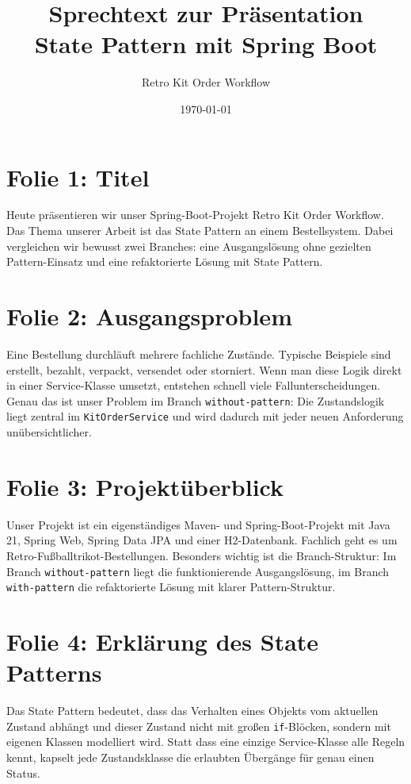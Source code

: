 \documentclass[a4paper,11pt]{article}
\title{Sprechtext zur Präsentation\\State Pattern mit Spring Boot}
\author{Retro Kit Order Workflow}
\date{\today}
\begin{document}
\maketitle

\section*{Folie 1: Titel}
Heute präsentieren wir unser Spring-Boot-Projekt \glqq Retro Kit Order Workflow\grqq. Das Thema unserer Arbeit ist das State Pattern an einem Bestellsystem. Dabei vergleichen wir bewusst zwei Branches: eine Ausgangslösung ohne gezielten Pattern-Einsatz und eine refaktorierte Lösung mit State Pattern.

\section*{Folie 2: Ausgangsproblem}
Eine Bestellung durchläuft mehrere fachliche Zustände. Typische Beispiele sind erstellt, bezahlt, verpackt, versendet oder storniert. Wenn man diese Logik direkt in einer Service-Klasse umsetzt, entstehen schnell viele Fallunterscheidungen. Genau das ist unser Problem im Branch \texttt{without-pattern}: Die Zustandslogik liegt zentral im \texttt{KitOrderService} und wird dadurch mit jeder neuen Anforderung unübersichtlicher.

\section*{Folie 3: Projektüberblick}
Unser Projekt ist ein eigenständiges Maven- und Spring-Boot-Projekt mit Java 21, Spring Web, Spring Data JPA und einer H2-Datenbank. Fachlich geht es um Retro-Fußballtrikot-Bestellungen. Besonders wichtig ist die Branch-Struktur: Im Branch \texttt{without-pattern} liegt die funktionierende Ausgangslösung, im Branch \texttt{with-pattern} die refaktorierte Lösung mit klarer Pattern-Struktur.

\section*{Folie 4: Erklärung des State Patterns}
Das State Pattern bedeutet, dass das Verhalten eines Objekts vom aktuellen Zustand abhängt und dieser Zustand nicht mit großen \texttt{if}-Blöcken, sondern mit eigenen Klassen modelliert wird. Statt dass eine einzige Service-Klasse alle Regeln kennt, kapselt jede Zustandsklasse die erlaubten Übergänge für genau einen Status.
\end{document}
